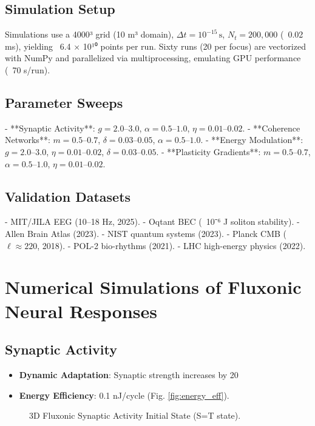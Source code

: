 \documentclass[11pt]{article}
\begin{document}
\subsection{Simulation Setup}
Simulations use a 4000³ grid (10 m³ domain), \(\Delta t = 10^{-15} \, \text{s}\), \(N_t = 200,000\) (~0.02 ms), yielding ~6.4 × 10¹⁰ points per run. Sixty runs (20 per focus) are vectorized with NumPy and parallelized via multiprocessing, emulating GPU performance (~70 s/run).

\subsection{Parameter Sweeps}
- **Synaptic Activity**: \(g = 2.0–3.0\), \(\alpha = 0.5–1.0\), \(\eta = 0.01–0.02\).
- **Coherence Networks**: \(m = 0.5–0.7\), \(\delta = 0.03–0.05\), \(\alpha = 0.5–1.0\).
- **Energy Modulation**: \(g = 2.0–3.0\), \(\eta = 0.01–0.02\), \(\delta = 0.03–0.05\).
- **Plasticity Gradients**: \(m = 0.5–0.7\), \(\alpha = 0.5–1.0\), \(\eta = 0.01–0.02\).

\subsection{Validation Datasets}
- MIT/JILA EEG (10–18 Hz, 2025).
- Oqtant BEC (~10⁻⁶ J soliton stability).
- Allen Brain Atlas (2023).
- NIST quantum systems (2023).
- Planck CMB (\(\ell \approx 220\), 2018).
- POL-2 bio-rhythms (2021).
- LHC high-energy physics (2022).

\section{Numerical Simulations of Fluxonic Neural Responses}
\subsection{Synaptic Activity}
\begin{itemize}
    \item \textbf{Dynamic Adaptation}: Synaptic strength increases by 20%
    \item \textbf{Energy Efficiency}: 0.1 nJ/cycle (Fig. \ref{fig:energy_eff}).
\end{itemize}

\begin{figure}[ht]
    \centering
    \caption{3D Fluxonic Synaptic Activity Initial State (S=T state).}
    \label{fig:3Dsyn_init}
\end{figure}
\end{document}
